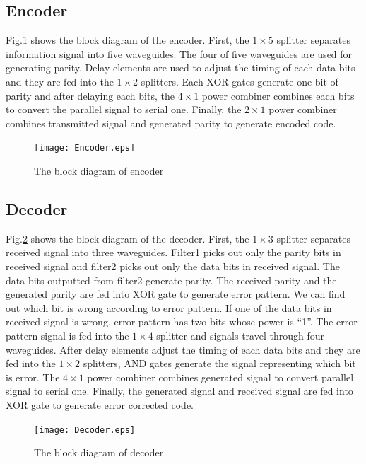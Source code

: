\documentclass[twocolumn,a4paper]{article}
\begin{document}
\subsection{Encoder}
Fig.{\ref{figure:encoder}} shows the block diagram of the encoder. First, the $1 \times 5$ splitter separates information signal into five waveguides. The four of five waveguides are used for generating parity. Delay elements are used to adjust the timing of each data bits and they are fed into the $1 \times 2$ splitters. Each XOR gates generate one bit of parity and after delaying each bits, the $4 \times 1$ power combiner combines each bits to convert the parallel signal to serial one. Finally, the $2 \times 1$ power combiner combines transmitted signal and generated parity to generate encoded code.

\begin{figure}[htbp]
\begin{center}
  \texttt{[image: Encoder.eps]}
  \caption{The block diagram of encoder}
 \label{figure:encoder}
\end{center}
\end{figure}

\subsection{Decoder}
Fig.{\ref{figure:decoder}} shows the block diagram of the decoder. First, the $1 \times 3$ splitter separates received signal into three waveguides. Filter1 picks out only the parity bits in received signal and filter2 picks out only the data bits in received signal. The data bits outputted from filter2 generate parity. The received parity and the generated parity are fed into XOR gate to generate error pattern. We can find out which bit is wrong according to error pattern. If one of the data bits in received signal is wrong, error pattern has two bits whose power is ``1''. The error pattern signal is fed into the $1 \times 4$ splitter and signals travel through four waveguides. After delay elements adjust the timing of each data bits and they are fed into the $1 \times 2$ splitters, AND gates  generate the signal representing which bit is error. The $4 \times 1$ power combiner combines generated signal to convert parallel signal to serial one. Finally, the generated signal and received signal are fed into XOR gate to generate error corrected code.

\begin{figure}[htbp]
\begin{center}
  \texttt{[image: Decoder.eps]}
  \caption{The block diagram of decoder}
  \label{figure:decoder}
\end{center}
\end{figure}
\end{document}
